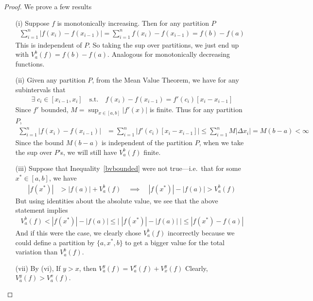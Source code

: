 \documentclass[12pt]{book}
\numberwithin{equation}{section} %
\theoremstyle{plain}
\theoremstyle{definition}
\theoremstyle{remark}
\begin{document}
\begin{proof}
We prove a few results
\begin{enumerate}[label=(\roman*)]
  \item[(i)]
    Suppose $f$ is monotonically increasing.
    Then for any partition $P$
    \begin{align*}
      \sum_{i=1}^n
      \big| f(x_i) -f(x_{i-1})\big|
      =
      \sum_{i=1}^n
      f(x_i) -f(x_{i-1})
      = f(b) - f(a)
    \end{align*}
    This is independent of $P$. So taking the sup over partitions, we
    just end up with $V^b_a(f)=f(b)-f(a)$. Analogous for monotonically
    decreasing functions.

  \item[(ii)]
    Given any partition $P$, from the Mean Value Theorem, we have for
    any subintervals that
    \begin{align*}
        \exists\; c_i \in [x_{i-1}, x_i] \quad \text{s.t.}
        \quad f(x_i) - f(x_{i-1}) = f'(c_i) \left[
        x_i - x_{i-1}\right]
    \end{align*}
    Since $f'$ bounded, $M=\sup_{x\in[a,b]} |f'(x)|$ is finite. Thus for
    any partition $P$,
    \begin{align*}
      \sum^n_{i=1}
      \big\lvert
      f(x_i) - f(x_{i-1})
      \big\rvert
      &=
      \sum^n_{i=1}
      \big\lvert
          f'(c_i)
          \left[x_i - x_{i-1}\right]
      \big\rvert
      \leq \sum^n_{i=1} M \left\lvert \Delta x_i
          \right\rvert = M(b-a) < \infty
    \end{align*}
    Since the bound $M(b-a)$ is independent of the partition $P$, when
    we take the sup over $P$'s, we will still have $V_a^b(f)$ finite.

  \item[(iii)]
    Suppose that Inequality~\ref{bvbounded} were not true---i.e.\ that
    for some $x^* \in [a,b]$, we have
    \begin{align*}
      |f(x^*)| &> |f(a)| + V_a^b(f)
      \quad\implies\quad
      |f(x^*)| - |f(a)|  > V_a^b(f)
    \end{align*}
    But using identities about the absolute value, we see that the above
    statement implies
    \begin{align*}
        V_a^b(f) < |f(x^*)| - |f(a)| \leq \big\lvert \;
            |f(x^*)| - |f(a)|\;\big\rvert
            \leq |f(x^*) - f(a)|
    \end{align*}
    And if this were the case, we clearly chose $V_a^b(f)$ incorrectly
    because we could define a partition by $\{a, x^*, b\}$ to get a
    bigger value for the total variation than $V_a^b(f)$.

  \item[(vii)] By (vi), If $y>x$, then $V_a^y(f) = V_a^x(f) + V_x^y(f)$
    Clearly, $V_a^y(f) >V_a^x(f)$.
\end{enumerate}
\end{proof}
\end{document}
